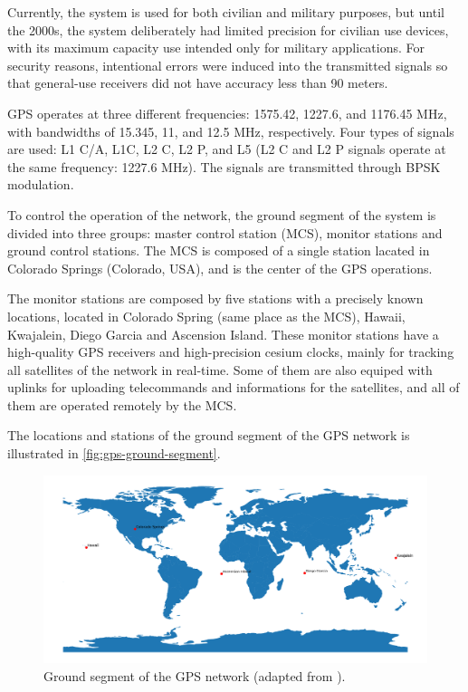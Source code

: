 Currently, the system is used for both civilian and military purposes, but until the 2000s, the system deliberately had limited precision for civilian use devices, with its maximum capacity use intended only for military applications. For security reasons, intentional errors were induced into the transmitted signals so that general-use receivers did not have accuracy less than 90 meters.


GPS operates at three different frequencies: 1575.42, 1227.6, and 1176.45 MHz, with bandwidths of 15.345, 11, and 12.5 MHz, respectively. Four types of signals are used: L1 C/A, L1C, L2 C, L2 P, and L5 (L2 C and L2 P signals operate at the same frequency: 1227.6 MHz). The signals are transmitted through BPSK modulation.

To control the operation of the network, the ground segment of the system is divided into three groups: master control station (MCS), monitor stations and ground control stations. The MCS is composed of a single station lacated in Colorado Springs (Colorado, USA), and is the center of the GPS operations.

The monitor stations are composed by five stations with a precisely known locations, located in Colorado Spring (same place as the MCS), Hawaii, Kwajalein, Diego Garcia and Ascension Island. These monitor stations have a high-quality GPS receivers and high-precision cesium clocks, mainly for tracking all satellites of the network in real-time. Some of them are also equiped with uplinks for uploading telecommands and informations for the satellites, and all of them are operated remotely by the MCS.

The locations and stations of the ground segment of the GPS network is illustrated in \autoref{fig:gps-ground-segment}.

\begin{figure}[!ht]
    \begin{center}
        \includegraphics[width=\columnwidth]{curves/gps-ground-segment}
        \caption{Ground segment of the GPS network (adapted from \cite{el-rabbany2002}).}
        \label{fig:gps-ground-segment}
    \end{center}
\end{figure}

